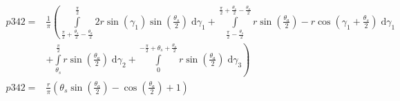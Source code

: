 \begin{align}
    p342 =&\frac{1}{\pi} \left(\int\limits_{\frac{\pi}{2} + \frac{\theta_{s}}{2} - \frac{\theta_{a}}{2}}^{\frac{\pi}{2}}2 r \sin{\left (\gamma_{1} \right )} \sin{\left (\frac{\theta_{s}}{2} \right )}\;\mathrm{d}\gamma_{1}+\int\limits_{\frac{\pi}{2} - \frac{\theta_{s}}{2}}^{\frac{\pi}{2} + \frac{\theta_{s}}{2} - \frac{\theta_{a}}{2}}r \sin{\left (\frac{\theta_{a}}{2} \right )} - r \cos{\left (\gamma_{1} + \frac{\theta_{s}}{2} \right )}\;\mathrm{d}\gamma_{1}\right.\\
 &\left.+\int\limits_{\theta_{s}}^{\frac{\pi}{2}}r \sin{\left (\frac{\theta_{a}}{2} \right )}\;\mathrm{d}\gamma_{2}+\int\limits_{0}^{- \frac{\pi}{2} + \theta_{s} + \frac{\theta_{a}}{2}}r \sin{\left (\frac{\theta_{a}}{2} \right )}\;\mathrm{d}\gamma_{3}\right)\\
    p342 =& \frac{r}{\pi} \left(\theta_{s} \sin{\left (\frac{\theta_{a}}{2} \right )} - \cos{\left (\frac{\theta_{a}}{2} \right )} + 1\right)
\end{align}